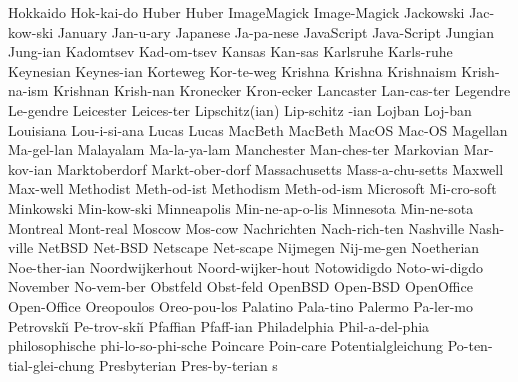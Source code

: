 \1 Hokkaido		Hok-kai-do
\NewWordtrue
\1 Huber		Huber			%
\1 ImageMagick		Image-Magick		%
\1 Jackowski		Jac-kow-ski		%
\1 January		Jan-u-ary
\1 Japanese		Ja-pa-nese
\1 JavaScript		Java-Script		%
\NewWordtrue
\1 Jungian		Jung-ian		%
\1 Kadomtsev		Kad-om-tsev
\1 Kansas		Kan-sas
\1 Karlsruhe		Karls-ruhe
\NewWordtrue
\1 Keynesian		Keynes-ian		%
\1 Korteweg		Kor-te-weg
\1 Krishna		Krishna
\1 Krishnaism		Krish-na-ism
\1 Krishnan		Krish-nan		%
\NewWordtrue
\1 Kronecker		Kron-ecker		%
\1 Lancaster		Lan-cas-ter
\1 Legendre		Le-gendre
\1 Leicester		Leices-ter
\2 Lipschitz(ian)	Lip-schitz -ian
\1 Lojban		Loj-ban		%
\1 Louisiana		Lou-i-si-ana
\NewWordtrue
\1 Lucas		Lucas			%
\NewWordtrue
\1 MacBeth		MacBeth			%
\1 MacOS		Mac-OS			%
\NewWordtrue
\1 Magellan		Ma-gel-lan		%
\1 Malayalam		Ma-la-ya-lam		%
\1 Manchester		Man-ches-ter
\1 Markovian		Mar-kov-ian
\1 Marktoberdorf	Markt-ober-dorf  %
\1 Massachusetts	Mass-a-chu-setts
\1 Maxwell		Max-well		%
\NewWordtrue
\1 Methodist		Meth-od-ist		%
\NewWordtrue
\1 Methodism		Meth-od-ism		%
\1 Microsoft		Mi-cro-soft		%
\1 Minkowski		Min-kow-ski		%
\1 Minneapolis		Min-ne-ap-o-lis
\1 Minnesota		Min-ne-sota
\1 Montreal		Mont-real		%
\1 Moscow		Mos-cow
\1 Nachrichten          Nach-rich-ten
\1 Nashville		Nash-ville
\1 NetBSD		Net-BSD 		%
\1 Netscape		Net-scape		%
\1 Nijmegen		Nij-me-gen
\1 Noetherian		Noe-ther-ian
\1 Noordwijkerhout	Noord-wijker-hout
\NewWordtrue
\1 Notowidigdo		Noto-wi-digdo		%
\1 November		No-vem-ber
\NewWordtrue
\1 Obstfeld		Obst-feld		%
\1 OpenBSD		Open-BSD		%
\1 OpenOffice		Open-Office		%
\NewWordtrue
\1 Oreopoulos		Oreo-pou-los		%
\1 Palatino		Pala-tino		%
\1 Palermo		Pa-ler-mo
\1 Petrovski\u\i{}	Pe-trov-ski\u\i{}	%
\1 Pfaffian		Pfaff-ian		%
\1 Philadelphia		Phil-a-del-phia
\1 philosophische       phi-lo-so-phi-sche	%
\1 Poincare		Poin-care
\1 Potentialgleichung	Po-ten-tial-glei-chung
\5 Presbyterian		Pres-by-terian s	%
